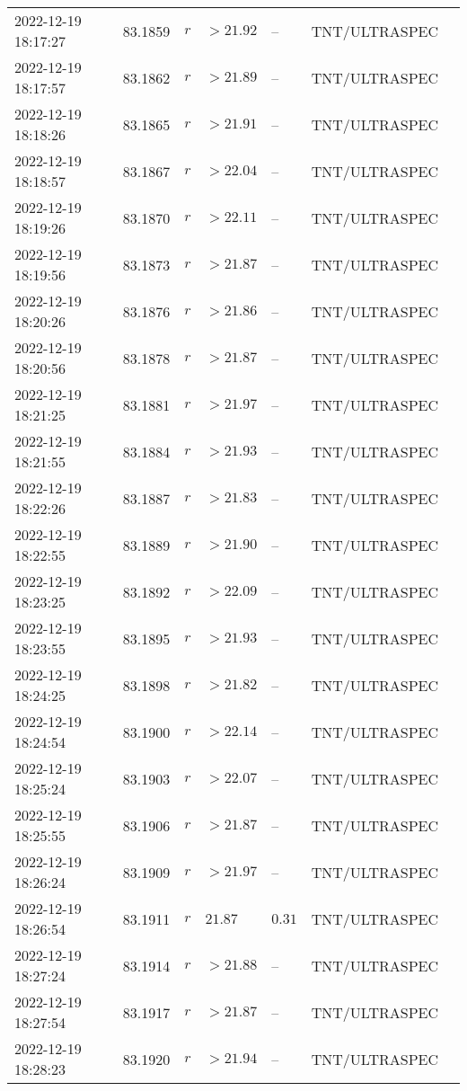 \documentclass{nature_plusfigure}
\begin{document}
\begin{supplement}
\begin{center}
\begin{longtable}{lllllll}
2022-12-19 18:17:27 & 83.1859 & $r$ & $>21.92$ & -- & TNT/ULTRASPEC &  \\ 
2022-12-19 18:17:57 & 83.1862 & $r$ & $>21.89$ & -- & TNT/ULTRASPEC &  \\ 
2022-12-19 18:18:26 & 83.1865 & $r$ & $>21.91$ & -- & TNT/ULTRASPEC &  \\ 
2022-12-19 18:18:57 & 83.1867 & $r$ & $>22.04$ & -- & TNT/ULTRASPEC &  \\ 
2022-12-19 18:19:26 & 83.1870 & $r$ & $>22.11$ & -- & TNT/ULTRASPEC &  \\ 
2022-12-19 18:19:56 & 83.1873 & $r$ & $>21.87$ & -- & TNT/ULTRASPEC &  \\ 
2022-12-19 18:20:26 & 83.1876 & $r$ & $>21.86$ & -- & TNT/ULTRASPEC &  \\ 
2022-12-19 18:20:56 & 83.1878 & $r$ & $>21.87$ & -- & TNT/ULTRASPEC &  \\ 
2022-12-19 18:21:25 & 83.1881 & $r$ & $>21.97$ & -- & TNT/ULTRASPEC &  \\ 
2022-12-19 18:21:55 & 83.1884 & $r$ & $>21.93$ & -- & TNT/ULTRASPEC &  \\ 
2022-12-19 18:22:26 & 83.1887 & $r$ & $>21.83$ & -- & TNT/ULTRASPEC &  \\ 
2022-12-19 18:22:55 & 83.1889 & $r$ & $>21.90$ & -- & TNT/ULTRASPEC &  \\ 
2022-12-19 18:23:25 & 83.1892 & $r$ & $>22.09$ & -- & TNT/ULTRASPEC &  \\ 
2022-12-19 18:23:55 & 83.1895 & $r$ & $>21.93$ & -- & TNT/ULTRASPEC &  \\ 
2022-12-19 18:24:25 & 83.1898 & $r$ & $>21.82$ & -- & TNT/ULTRASPEC &  \\ 
2022-12-19 18:24:54 & 83.1900 & $r$ & $>22.14$ & -- & TNT/ULTRASPEC &  \\ 
2022-12-19 18:25:24 & 83.1903 & $r$ & $>22.07$ & -- & TNT/ULTRASPEC &  \\ 
2022-12-19 18:25:55 & 83.1906 & $r$ & $>21.87$ & -- & TNT/ULTRASPEC &  \\ 
2022-12-19 18:26:24 & 83.1909 & $r$ & $>21.97$ & -- & TNT/ULTRASPEC &  \\ 
2022-12-19 18:26:54 & 83.1911 & $r$ & $21.87$ & $0.31$ & TNT/ULTRASPEC &  \\ 
2022-12-19 18:27:24 & 83.1914 & $r$ & $>21.88$ & -- & TNT/ULTRASPEC &  \\ 
2022-12-19 18:27:54 & 83.1917 & $r$ & $>21.87$ & -- & TNT/ULTRASPEC &  \\ 
2022-12-19 18:28:23 & 83.1920 & $r$ & $>21.94$ & -- & TNT/ULTRASPEC &  \\ 

\end{longtable}
\end{center}
\end{supplement}
\end{document}
